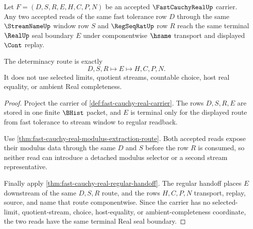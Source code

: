 \begin{theorem}
\label{thm:fast-cauchy-real-modulus-readback-determinacy}
Let $F=(D,S,R,E,H,C,P,N)$ be an accepted $\FastCauchyRealUp$ carrier. Any two accepted reads of the same fast tolerance row $D$ through the same $\StreamNameUp$ window row $S$ and $\RegSeqRatUp$ row $R$ reach the same terminal $\RealUp$ seal boundary $E$ under componentwise $\hsame$ transport and displayed $\Cont$ replay.

The determinacy route is exactly
$$
D,S,R \longmapsto E \longmapsto H,C,P,N .
$$
It does not use selected limits, quotient streams, countable choice, host real equality, or ambient Real completeness.
\end{theorem}
\begin{proof}
Project the carrier of \autoref{def:fast-cauchy-real-carrier}. The rows $D,S,R,E$ are stored in one finite $\BHist$ packet, and $E$ is terminal only for the displayed route from fast tolerance to stream window to regular readback.

Use \autoref{thm:fast-cauchy-real-modulus-extraction-route}. Both accepted reads expose their modulus data through the same $D$ and $S$ before the row $R$ is consumed, so neither read can introduce a detached modulus selector or a second stream representative.

Finally apply \autoref{thm:fast-cauchy-real-regular-handoff}. The regular handoff places $E$ downstream of the same $D,S,R$ route, and the rows $H,C,P,N$ transport, replay, source, and name that route componentwise. Since the carrier has no selected-limit, quotient-stream, choice, host-equality, or ambient-completeness coordinate, the two reads have the same terminal Real seal boundary.
\end{proof}

